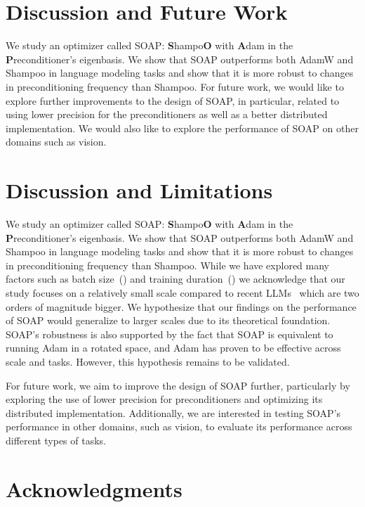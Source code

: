 \documentclass{article} %
\begin{document}
\section{Discussion and Future Work}
We study an optimizer called SOAP: \textbf{S}hampo\textbf{O} with \textbf{A}dam in the \textbf{P}reconditioner's eigenbasis. We show that SOAP outperforms both AdamW and Shampoo in language modeling tasks and show that it is more robust to changes in preconditioning frequency than Shampoo. For future work, we would like to explore further improvements to the design of SOAP, in particular, related to using lower precision for the preconditioners as well as a better distributed implementation. We would also like to explore the performance of SOAP on other domains such as vision.






\section{Discussion and Limitations}
We study an optimizer called SOAP: \textbf{S}hampo\textbf{O} with \textbf{A}dam in the \textbf{P}reconditioner's eigenbasis. We show that SOAP outperforms both AdamW and Shampoo in language modeling tasks and show that it is more robust to changes in preconditioning frequency than Shampoo. While we have explored many factors such as batch size~() and training duration~() we acknowledge that our study focuses on a relatively small scale compared to recent LLMs~\cite{llama} which are two orders of magnitude bigger. We hypothesize that our findings on the performance of SOAP would generalize to larger scales due to its theoretical foundation. SOAP's robustness is also supported by the fact that SOAP is equivalent to running Adam in a rotated space, and Adam has proven to be effective across scale and tasks. However, this hypothesis remains to be validated. %


For future work, we aim to improve the design of SOAP further, particularly by exploring the use of lower precision for preconditioners and optimizing its distributed implementation. Additionally, we are interested in testing SOAP’s performance in other domains, such as vision, to evaluate its performance across different types of tasks.


\section*{Acknowledgments}
\end{document}
